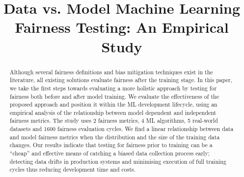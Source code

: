 \documentclass[conference]{IEEEtran}
\begin{document}
\title{Data vs. Model Machine Learning Fairness Testing: An Empirical Study}


\author{
\and
{}
\and
{}
}


\maketitle

\begin{abstract}

  Although several fairness definitions and bias mitigation techniques
  exist in the literature, all existing solutions evaluate fairness
  after the training stage. In this paper, we take the first steps
  towards evaluating a more holistic approach by testing for fairness
  both before and after model training. We evaluate the effectiveness
  of the proposed approach and position it within the ML development
  lifecycle, using an empirical analysis of the relationship between
  model dependent and independent fairness metrics. The study uses 2
  fairness metrics, 4 ML algorithms, 5 real-world datasets and
  1600 fairness evaluation cycles. We find a linear relationship
  between data and model fairness metrics when the distribution and
  the size of the training data changes. Our results indicate that
  testing for fairness prior to training can be a ``cheap'' and
  effective means of catching a biased data collection process early;
  detecting data drifts in production systems and minimising execution
  of full training cycles thus reducing development time and costs.

\end{abstract}
\end{document}
